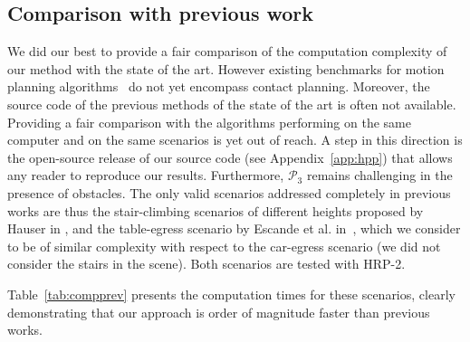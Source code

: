 \subsection{Comparison with previous work} \label{sec:compa}
We did our best to provide a fair comparison of the computation complexity of our method with the state of the art. 
However existing benchmarks for motion planning algorithms~\cite{moll2014extensible} do not yet encompass contact planning.
Moreover, the source code of the previous methods of the state of the art is often not available.
Providing a fair comparison with the algorithms performing on the same computer and on the same scenarios is yet out of reach.
A step in this direction is the open-source release of our source code (see Appendix~\ref{app:hpp}) that allows any reader to reproduce our results.
Furthermore, $\mathcal{P}_3$ remains challenging in the presence of obstacles. The only valid scenarios addressed completely in previous works are thus the stair-climbing scenarios of different heights proposed by Hauser in \cite{Hauser06usingmotion}, and the table-egress scenario by Escande et al. in~\cite{DBLP:conf/iser/EscandeKMG08}, which we consider to be of similar complexity with respect to the car-egress scenario (we did not consider the stairs in the scene). Both scenarios are tested with HRP-2.

Table~\ref{tab:compprev} presents the computation times for these scenarios, clearly demonstrating that our approach is order of magnitude faster than previous works.




